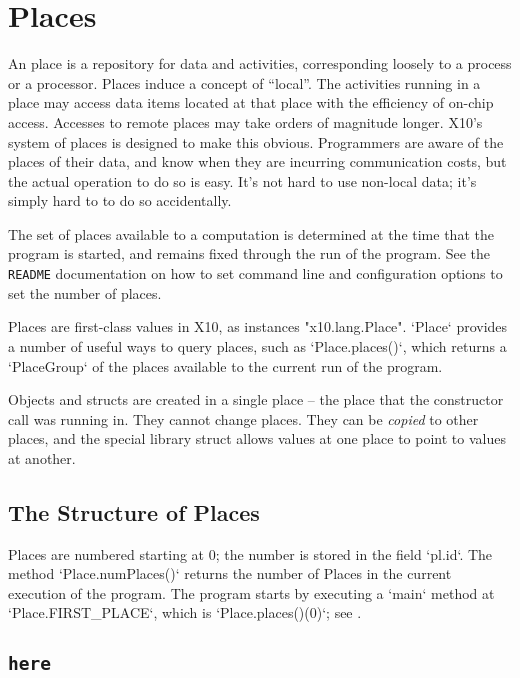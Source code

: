 
\chapter{Places}
\label{XtenPlaces}

An \Xten{} place is a repository for data and activities, corresponding
loosely to a process or a processor. Places induce a concept of ``local''. The
activities running in a place may access data items located at that place with
the efficiency of on-chip access. Accesses to remote places may take orders of
magnitude longer. X10's system of places is designed to make this obvious.
Programmers are aware of the places of their data, and know when they are
incurring communication costs, but the actual operation to do so is easy. It's
not hard to use non-local data; it's simply hard to to do so accidentally.

The set of places available to a computation is determined at the time that
the program is started, and remains fixed through the run of the program. See
the {\tt README} documentation on how to set command line and configuration
options to set the number of places.

Places are first-class values in X10, as instances 
\xcd"x10.lang.Place".   \xcd`Place` provides a number of useful ways to
query places, such as \xcd`Place.places()`, which returns a
\xcd`PlaceGroup` of the places available to the current run of the program.

Objects and structs are created in a single place -- the
place that the constructor call was running in. They cannot change places.
They can be {\em copied} to other places, and the special library struct
 allows values at one place to point to values at another.  

\section{The Structure of Places}

Places are numbered starting at 0; the number is stored
in the field \xcd`pl.id`.  The method \xcd`Place.numPlaces()` returns the number of
Places in the current execution of the program. 
The program starts by executing a \xcd`main` method at
\xcd`Place.FIRST_PLACE`, which is 
\xcd`Place.places()(0)`; see
. 

\section{{\tt here}}\label{Here}

